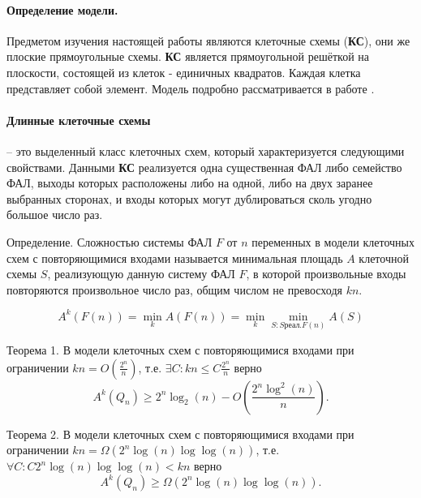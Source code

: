 \paragraph{Определение модели.} Предметом изучения настоящей работы являются клеточные схемы (\textbf{КС}), они же плоские прямоугольные схемы. \textbf{КС} является прямоугольной решёткой на плоскости, состоящей из клеток - единичных квадратов. Каждая клетка представляет собой элемент. Модель подробно рассматривается в работе \cite{Kazan}.

\paragraph{Длинные клеточные схемы} -- это выделенный класс клеточных схем, который характеризуется следующими свойствами. Данными \textbf{КС} реализуется одна существенная ФАЛ либо семейство ФАЛ, выходы которых расположены либо на одной, либо на двух заранее выбранных сторонах, и входы которых могут дублироваться сколь угодно большое число раз.

Определение. Сложностью системы ФАЛ $F$ от $n$ переменных в модели клеточных схем с повторяющимися входами называется минимальная площадь $A$ клеточной схемы $S$, реализующую данную систему ФАЛ $F$, в которой произвольные входы повторяются произвольное число раз, общим числом не превосходя $kn$.

$$  A^k(F(n)) = \min_{k} A(F(n)) = \min_{k} \min_{S: S \text{реал.} F(n)} A(S)$$

Теорема 1. В модели клеточных схем с повторяющимися входами при ограничении $kn = O(\frac{2^n}{n})$, т.е. $\exists C: kn \leqslant C\frac{2^n}{n}$ верно
$$  A^k(Q_n) \geqslant 2^{n}\log_2(n) - O(\frac{2^n \log^2(n)}{n}).$$

Теорема 2. В модели клеточных схем с повторяющимися входами при ограничении $kn = \Omega(2^n \log(n) \log\log(n))$, т.е. $\forall C : C2^n\log(n) \log\log(n) < kn$ верно
$$  A^k(Q_n) \geqslant \Omega(2^n \log(n)\log\log(n)).$$


%

%

